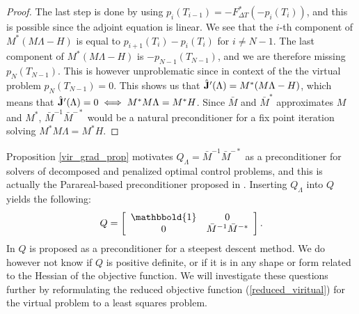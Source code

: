 \begin{proof}
The last step is done by using $p_i(T_{i-1})=-F_{\Delta T}^*(-p_i(T_i))$, and this is possible since the adjoint equation is linear. We see that the $i$-th component of $M^* (M \Lambda-H)$ is equal to $p_{i+1}(T_i)-p_{i}(T_i)$ for $i\neq N-1$. The last component of $M^* (M \Lambda-H)$ is $-p_{N-1}(T_{N-1})$, and we are therefore missing $p_N(T_{N-1})$. This is however unproblematic since in context of the the virtual problem $p_N(T_{N-1})=0$. This shows us that $\hat{\bold J}'(\Lambda)= M^* (M \Lambda-H)$, which means that $\hat{\bold J}'(\Lambda)=0 \iff M^*M\Lambda =M^*H$. Since $\bar M$ and $\bar M^*$ approximates $M$ and $M^*$, $\bar{M}^{-1}\bar M^{-*}$ would be a natural preconditioner for a fix point iteration solving $M^*M\Lambda =M^*H$. 
\end{proof}
\noindent
Proposition \ref{vir_grad_prop} motivates $Q_{\Lambda}=\bar{M}^{-1}\bar M^{-*}$ as a preconditioner for solvers of decomposed and penalized optimal control problems, and this is actually the Parareal-based preconditioner proposed in \cite{maday2002parareal}. Inserting $Q_{\Lambda}$ into $Q$ yields the following:
\begin{align}
Q = \left[ \begin{array}{cc}
	\mathbbold{1} & 0 \\
	0 &  \bar{M}^{-1}\bar{M}^{-*}\\
	\end{array} \right]. \label{Q_PC}
\end{align}  
In \cite{maday2002parareal} $Q$ is proposed as a preconditioner for a steepest descent method. We do however not know if $Q$ is positive definite, or if it is in any shape or form related to the Hessian of the objective function. We will investigate these questions further by reformulating the reduced objective function (\ref{reduced_viritual}) for the virtual problem to a least squares problem.
